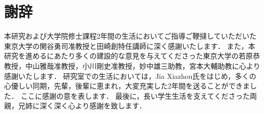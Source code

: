 \chapter*{謝辞}

本研究および大学院修士課程2年間の生活においてご指導ご鞭撻していただいた東京大学の関谷勇司准教授と田崎創特任講師に深く感謝いたします．
また，本研究を進めるにあたり多くの建設的な意見を与えてくださった東京大学の若原恭教授，中山雅哉准教授，小川剛史准教授，妙中雄三助教，宮本大輔助教に心より感謝いたします．
研究室での生活においては，Jia Xiazhou氏をはじめ，多くの心優しい同期，先輩，後輩に恵まれ，大変充実した2年間を送ることができました．
ここに感謝の意を表します．
最後に，長い学生生活を支えてくださった両親，兄姉に深く深く心より感謝を致します．